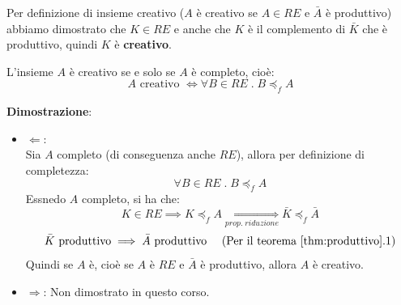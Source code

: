\documentclass[a4paper]{article}
\begin{document}
\vspace{1em}
\noindent
Per definizione di insieme creativo (\( A \) è creativo se \( A \in RE \) e
\( \bar{A} \) è produttivo)
abbiamo dimostrato che \( K \in RE \) e anche che \( K \) è il complemento
di \( \bar{K} \) che è produttivo, quindi \( K \) è \textbf{creativo}. 

\begin{theorem}
  L'insieme \( A \) è creativo se e solo se \( A \) è completo, cioè:
  \[
    A \text{ creativo } \iff \forall B \in RE \;.\; B \preceq_f A
  \] 

  \vspace{1em}
  \noindent
  \textbf{Dimostrazione}:
  \begin{itemize}
    \item \( \Leftarrow \):\\
      Sia \( A \) completo (di conseguenza anche \( RE \)), allora per definizione di completezza:
      \[
        \forall B \in RE \;.\; B \preceq_f A
      \] 
      Essnedo \( A \) completo, si ha che:
      \[
        K \in RE \implies K \preceq_f A \underset{prop.\;riduzione}{\iff}
        \bar{K} \preceq_f \bar{A}
      \] 
      \[
        \bar{K} \text{ produttivo} \implies \bar{A} \text{ produttivo} \quad \text{ (Per il teorema \ref{thm:produttivo}.1)}
      \] 
      Quindi se \( A \) è, cioè se \( A \) è \( RE \) e \( \bar{A} \) è produttivo, allora
      \( A \) è creativo.

    \item \( \Rightarrow \): Non dimostrato in questo corso.
  \end{itemize}
\end{theorem}
\end{document}
